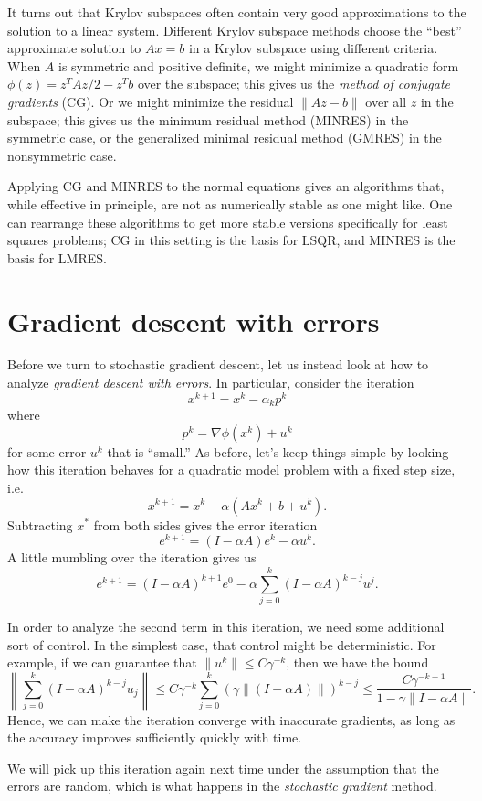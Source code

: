 \documentclass[12pt, leqno]{article} %
\begin{document}
It turns out that Krylov subspaces often contain very good
approximations to the solution to a linear system.  Different Krylov
subspace methods choose the ``best'' approximate solution to $Ax = b$
in a Krylov subspace using different criteria.  When $A$ is symmetric
and positive definite, we might minimize a quadratic
form $\phi(z) = z^T Az/2 - z^T b$ over the subspace; this gives us
the {\em method of conjugate gradients} (CG).  Or we might minimize
the residual $\|Az-b\|$ over all $z$ in the subspace; this gives us
the minimum residual method (MINRES) in the symmetric case, or the
generalized minimal residual method (GMRES) in the nonsymmetric case.

Applying CG and MINRES to the normal equations gives an algorithms
that, while effective in principle, are not as numerically stable as
one might like.  One can rearrange these algorithms to get more stable
versions specifically for least squares problems; CG in this setting
is the basis for LSQR, and MINRES is the basis for LMRES.

\section{Gradient descent with errors}

Before we turn to stochastic gradient descent, let us instead look at
how to analyze {\em gradient descent with errors}.  In particular,
consider the iteration
\[
  x^{k+1} = x^k - \alpha_k p^k
\]
where
\[
  p^k = \nabla \phi(x^k) + u^k
\]
for some error $u^k$ that is ``small.''  As before, let's keep things
simple by looking how this iteration behaves for a quadratic model
problem with a fixed step size, i.e.
\[
  x^{k+1} = x^k - \alpha (Ax^k + b + u^k).
\]
Subtracting $x^*$ from both sides gives the error iteration
\[
  e^{k+1} = (I-\alpha A) e^k - \alpha u^k.
\]  
A little mumbling over the iteration gives us
\[
  e^{k+1} = (I-\alpha A)^{k+1} e^0 - \alpha \sum_{j=0}^k (I-\alpha A)^{k-j} u^j.
\]

In order to analyze the second term in this iteration, we need some
additional sort of control.  In the simplest case, that control might
be deterministic.  For example, if we can guarantee that
$\|u^k\| \leq C \gamma^{-k}$, then we have the bound
\[
  \left\| \sum_{j=0}^k  (I-\alpha A)^{k-j} u_j \right\| \leq
  C \gamma^{-k} \sum_{j=0}^k \left( \gamma \|(I-\alpha A)\|\right)^{k-j} \leq
  \frac{C \gamma^{-k-1}}{1-\gamma \|I-\alpha A\|}.
\]
Hence, we can make the iteration converge with inaccurate gradients,
as long as the accuracy improves sufficiently quickly with time.

We will pick up this iteration again next time under the assumption
that the errors are random, which is what happens in the
{\em stochastic gradient} method.
\end{document}
